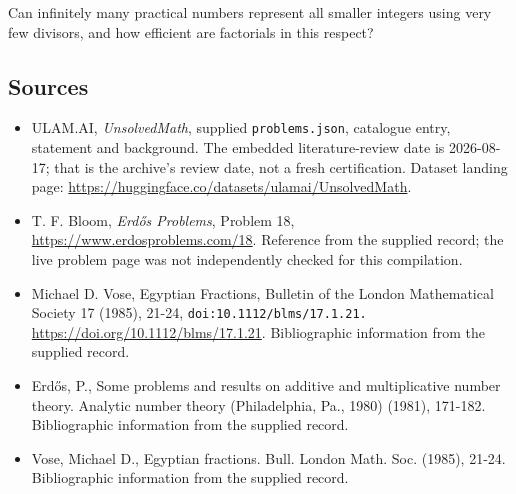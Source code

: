 \documentclass[11pt,a4paper]{article}
\begin{document}
Can infinitely many practical numbers represent all smaller integers using very few divisors, and how efficient are factorials in this respect?

\subsection{Sources}

{\small

\begin{itemize}

\item[\hypertarget{source:statement:1}{S1}] ULAM.AI, \emph{UnsolvedMath}, supplied \texttt{problems.json}, catalogue entry, statement and background. The embedded literature-review date is 2026-08-17; that is the archive’s review date, not a fresh certification. Dataset landing page: \url{https://huggingface.co/datasets/ulamai/UnsolvedMath}.

\item[\hypertarget{source:statement:2}{S2}] T. F. Bloom, \emph{Erdős Problems}, Problem 18, \url{https://www.erdosproblems.com/18}. Reference from the supplied record; the live problem page was not independently checked for this compilation.

\item[\hypertarget{source:statement:3}{S3}] Michael D. Vose, Egyptian Fractions, Bulletin of the London Mathematical Society 17 (1985), 21-24, \nolinkurl{doi:10.1112/blms/17.1.21.} \url{https://doi.org/10.1112/blms/17.1.21}. Bibliographic information from the supplied record.

\item[\hypertarget{source:statement:4}{S4}] Erd\H{o}s, P., Some problems and results on additive and multiplicative number theory. Analytic number theory (Philadelphia, Pa., 1980) (1981), 171-182. Bibliographic information from the supplied record.

\item[\hypertarget{source:statement:5}{S5}] Vose, Michael D., Egyptian fractions. Bull. London Math. Soc. (1985), 21-24. Bibliographic information from the supplied record.

\end{itemize}

}

\label{end:statement}
\end{document}
